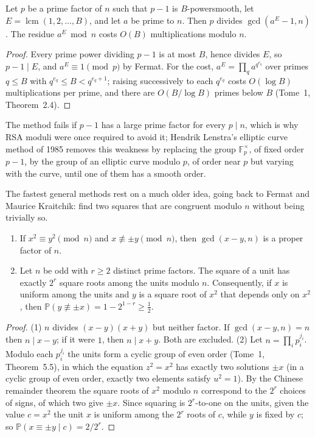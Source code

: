 \begin{proposition}\label{prop:pminus1}
Let $p$ be a prime factor of $n$ such that $p-1$ is $B$-powersmooth, let $E=\operatorname{lcm}(1,2,\dots,B)$, and let $a$ be prime to $n$. Then $p$ divides $\gcd(a^E-1,n)$. The residue $a^E\bmod n$ costs $O(B)$ multiplications modulo $n$.
\end{proposition}
\begin{proof}
Every prime power dividing $p-1$ is at most $B$, hence divides $E$, so $p-1\mid E$, and $a^E\equiv1\pmod p$ by Fermat. For the cost, $a^E=\prod_qa^{q^{e_q}}$ over primes $q\le B$ with $q^{e_q}\le B<q^{e_q+1}$; raising successively to each $q^{e_q}$ costs $O(\log B)$ multiplications per prime, and there are $O(B/\log B)$ primes below $B$ (Tome~1, Theorem~2.4).
\end{proof}

The method fails if $p-1$ has a large prime factor for every $p\mid n$, which is why RSA moduli were once required to avoid it; Hendrik Lenstra's elliptic curve method of 1985 removes this weakness by replacing the group $\mathbb F_p^\times$, of fixed order $p-1$, by the group of an elliptic curve modulo $p$, of order near $p$ but varying with the curve, until one of them has a smooth order.

The fastest general methods rest on a much older idea, going back to Fermat and Maurice Kraitchik: find two squares that are congruent modulo $n$ without being trivially so.

\begin{proposition}\label{prop:squares}
\begin{enumerate}
\item If $x^2\equiv y^2\pmod n$ and $x\not\equiv\pm y\pmod n$, then $\gcd(x-y,n)$ is a proper factor of $n$.
\item Let $n$ be odd with $r\ge2$ distinct prime factors. The square of a unit has exactly $2^r$ square roots among the units modulo $n$. Consequently, if $x$ is uniform among the units and $y$ is a square root of $x^2$ that depends only on $x^2$, then $\mathbb P(y\not\equiv\pm x)=1-2^{1-r}\ge\frac12$.
\end{enumerate}
\end{proposition}
\begin{proof}
(1) $n$ divides $(x-y)(x+y)$ but neither factor. If $\gcd(x-y,n)=n$ then $n\mid x-y$; if it were $1$, then $n\mid x+y$. Both are excluded.
(2) Let $n=\prod_ip_i^{j_i}$. Modulo each $p_i^{j_i}$ the units form a cyclic group of even order (Tome~1, Theorem~5.5), in which the equation $z^2=x^2$ has exactly two solutions $\pm x$ (in a cyclic group of even order, exactly two elements satisfy $u^2=1$). By the Chinese remainder theorem the square roots of $x^2$ modulo $n$ correspond to the $2^r$ choices of signs, of which two give $\pm x$. Since squaring is $2^r$-to-one on the units, given the value $c=x^2$ the unit $x$ is uniform among the $2^r$ roots of $c$, while $y$ is fixed by $c$; so $\mathbb P(x\equiv\pm y\mid c)=2/2^r$.
\end{proof}

